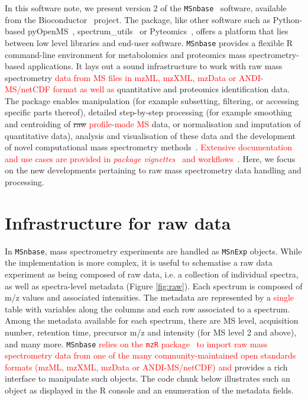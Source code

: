 \documentclass[journal=jacsat,manuscript=article]{achemso}\usepackage[]{graphicx}\usepackage[]{color}
\begin{document}
In this software note, we present version 2 of the
\texttt{MSnbase}~\cite{Gatto:2012} software, available from the
Bioconductor~\cite{Huber:2015} project. The package, like other
software such as Python-based {pyOpenMS}~\cite{Rost:2014},
spectrum\_utils~\cite{Bittremieux:2020} or
Pyteomics~\cite{Goloborodko:2013}, offers a platform that lies between
low level libraries and end-user software. \texttt{MSnbase} provides a
flexible R~\cite{R} command-line environment for metabolomics and
proteomics mass spectrometry-based applications. It lays out a sound
infrastructure to work with raw mass spectrometry \textcolor{red}{data
  from MS files in mzML, mzXML, mzData or ANDI-MS/netCDF format as
  well as} quantitative and proteomics identification data. The
package enables manipulation (for example subsetting, filtering, or
accessing specific parts thereof), detailed step-by-step processing
(for example smoothing and centroiding of \sout{raw}
\textcolor{red}{profile-mode MS} data, or normalisation and imputation
of quantitative data), analysis and visualisation of these data and
the development of novel computational mass spectrometry
methods~\cite{Stanstrup:2019}. \textcolor{red}{Extensive documentation
  and use cases are provided in \textit{package
    vignettes}~\cite{MSnbaseVignettes} and
  workflows~\cite{xcmsWorkflow}.} Here, we focus on the new
developments pertaining to raw mass spectrometry data handling and
processing.

\section{Infrastructure for raw data}

In \texttt{MSnbase}, mass spectrometry experiments are handled as
\texttt{MSnExp} objects. While the implementation is more complex, it
is useful to schematise a raw data experiment as being composed of raw
data, i.e. a collection of individual spectra, as well as
spectra-level metadata (Figure \ref{fig:raw}). Each spectrum is
composed of m/z values and associated intensities. The metadata are
represented by a \textcolor{red}{single} table with variables along
the columns and each row associated to a spectrum. Among the metadata
available for each spectrum, there are MS level, acquisition number,
retention time, precursor m/z and intensity (for MS level 2 and
above), and many more. \texttt{MSnbase} \textcolor{red}{relies on the
  \texttt{mzR} package~\cite{Chambers:2012} to import raw mass
  spectrometry data from one of the many community-maintained open
  standards formats (mzML, mzXML, mzData or ANDI-MS/netCDF) and}
provides a rich interface to manipulate such objects. The code chunk
below illustrates such an object as displayed in the R console and an
enumeration of the metadata fields.
\end{document}
